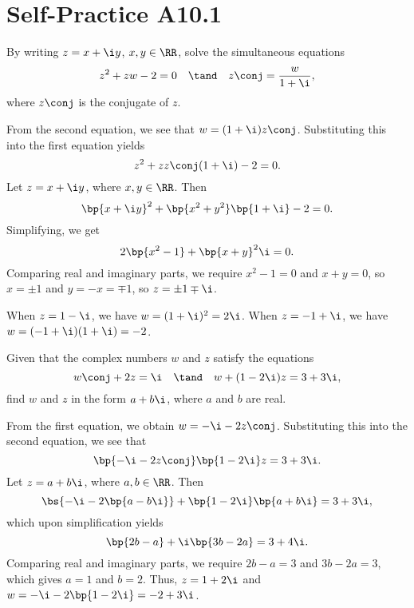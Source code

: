\section{Self-Practice A10.1}

\begin{problem}
    By writing $z = x + \i y$, $x, y \in \RR$, solve the simultaneous equations \[z^2 + zw - 2 = 0 \quad \tand \quad z\conj = \frac{w}{1 + \i},\] where $z\conj$ is the conjugate of $z$.
\end{problem}
\begin{solution}
    From the second equation, we see that $w = (1+\i) z\conj$. Substituting this into the first equation yields \[z^2 + zz\conj (1+\i) - 2 = 0.\] Let $z = x + \i y$, where $x, y \in \RR$. Then \[\bp{x + \i y}^2 + \bp{x^2 + y^2} \bp{1 + \i} - 2 = 0.\] Simplifying, we get \[2\bp{x^2 - 1} + \bp{x + y}^2 \i = 0.\] Comparing real and imaginary parts, we require $x^2 - 1 = 0$ and $x + y = 0$, so $x =  \pm 1$ and $y = -x = \mp 1$, so $z = \pm 1 \mp \i$.

    When $z = 1 - \i$, we have $w = (1 + \i)^2 = 2\i$. When $z = -1 + \i$, we have $w = (-1 + \i)(1 + \i) = -2$.
\end{solution}

\begin{problem}
    Given that the complex numbers $w$ and $z$ satisfy the equations \[w\conj + 2z = \i \quad \tand \quad w + (1 - 2\i)z = 3 + 3\i,\] find $w$ and $z$ in the form $a + b \i$, where $a$ and $b$ are real.
\end{problem}
\begin{solution}
    From the first equation, we obtain $w = -\i - 2z\conj$. Substituting this into the second equation, we see that \[\bp{-\i - 2z\conj}\bp{1 - 2\i}z = 3 + 3\i.\] Let $z = a + b\i$, where $a, b \in \RR$. Then \[\bs{-\i - 2\bp{a-b\i}} + \bp{1 - 2\i}\bp{a + b\i} = 3 + 3\i,\] which upon simplification yields \[\bp{2b - a} + \i\bp{3b - 2a} = 3 + 4\i.\] Comparing real and imaginary parts, we require $2b - a = 3$ and $3b - 2a = 3$, which gives $a = 1$ and $b = 2$. Thus, $z = 1 + 2\i$ and $w = -\i - 2\bp{1 - 2\i} = -2 + 3\i$.
\end{solution}

